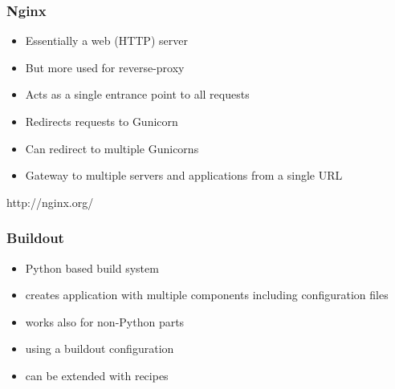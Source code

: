 \documentclass{beamer}
\begin{document}
\begin{frame}
\frametitle<presentation>{Nginx}


\begin{itemize}
  \item Essentially a web (HTTP) server
  \item But more used for reverse-proxy
  \item Acts as a single entrance point to all requests
  \item Redirects requests to Gunicorn
  \item Can redirect to multiple Gunicorns
  \item Gateway to multiple servers and applications from a single URL
\end{itemize}

\centering
\footnotesize{http://nginx.org/}

\end{frame}

\begin{frame}
  \frametitle<presentation>{Buildout}
  \begin{itemize}
    \item Python based build system
    \item creates application with multiple components including configuration files
    \item works also for non-Python parts
    \item using a buildout configuration
    \item can be extended with recipes
  \end{itemize}
\end{frame}
\end{document}
